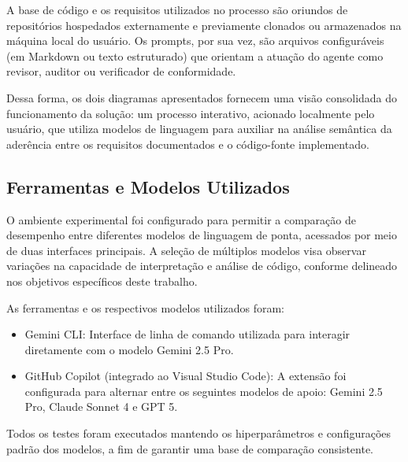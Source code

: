 A base de código e os requisitos utilizados no processo são oriundos de repositórios hospedados externamente e previamente clonados ou armazenados na máquina local do usuário. Os prompts, por sua vez, são arquivos configuráveis (em Markdown ou texto estruturado) que orientam a atuação do agente como revisor, auditor ou verificador de conformidade.

Dessa forma, os dois diagramas apresentados fornecem uma visão consolidada do funcionamento da solução: um processo interativo, acionado localmente pelo usuário, que utiliza modelos de linguagem para auxiliar na análise semântica da aderência entre os requisitos documentados e o código-fonte implementado.


\subsection{Ferramentas e Modelos Utilizados}

O ambiente experimental foi configurado para permitir a comparação de desempenho entre diferentes modelos de linguagem de ponta, acessados por meio de duas interfaces principais. A seleção de múltiplos modelos visa observar variações na capacidade de interpretação e análise de código, conforme delineado nos objetivos específicos deste trabalho.

As ferramentas e os respectivos modelos utilizados foram:

\begin{itemize}
    \item Gemini CLI: Interface de linha de comando utilizada para interagir diretamente com o modelo Gemini 2.5 Pro.
    \item GitHub Copilot (integrado ao Visual Studio Code): A extensão foi configurada para alternar entre os seguintes modelos de apoio: Gemini 2.5 Pro, Claude Sonnet 4 e GPT 5.
\end{itemize}

Todos os testes foram executados mantendo os hiperparâmetros e configurações padrão dos modelos, a fim de garantir uma base de comparação consistente.


